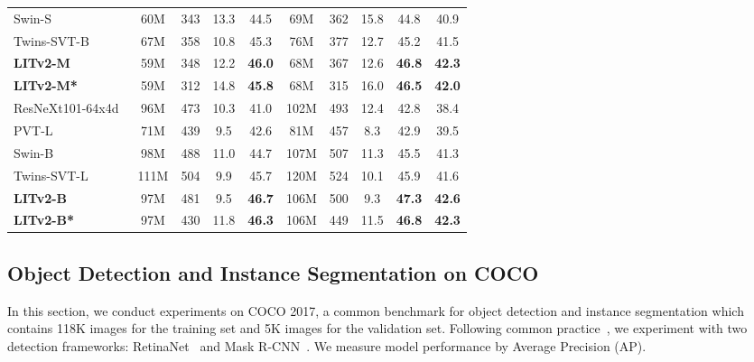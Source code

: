 \begin{table}[]
{\begin{tabular}{l|cccc|ccccc}
Swin-S~\cite{swin}                    & 60M         & 343       & 13.3 & 44.5          & 69M         & 362       & 15.8 & 44.8          & 40.9          \\
Twins-SVT-B~\cite{chu2021Twins}               & 67M         & 358       & 10.8 & 45.3          & 76M         & 377       & 12.7 & 45.2          & 41.5          \\
\textbf{LITv2-M}                  & 59M         & 348       & 12.2 & \textbf{46.0} & 68M         & 367       & 12.6 & \textbf{46.8} & \textbf{42.3} \\
\textbf{LITv2-M*}                  & 59M         & 312       & \textcolor{mblue}{14.8} & \textbf{45.8} & 68M         & 315       & \textcolor{mblue}{16.0} & \textbf{46.5} & \textbf{42.0} \\ \hline
ResNeXt101-64x4d~\cite{resnext}          & 96M         & 473       &  10.3    & 41.0          & 102M        & 493       &  12.4    & 42.8          & 38.4          \\
PVT-L~\cite{pvt}                    & 71M         & 439       & 9.5     & 42.6          & 81M         & 457       & 8.3     & 42.9          & 39.5          \\
Swin-B~\cite{swin}                 & 98M         & 488       & 11.0 & 44.7          & 107M        & 507       & 11.3 & 45.5          & 41.3          \\
Twins-SVT-L~\cite{chu2021Twins}              & 111M        & 504       & 9.9  & 45.7          & 120M        & 524       & 10.1 & 45.9          & 41.6          \\
\textbf{LITv2-B}          & 97M         & 481       & 9.5     & \textbf{46.7} & 106M        & 500       &  9.3    & \textbf{47.3} & \textbf{42.6} \\
\textbf{LITv2-B*}        & 97M         & 430       & \textcolor{mblue}{11.8}     & \textbf{46.3} & 106M        & 449       & \textcolor{mblue}{11.5}     & \textbf{46.8} & \textbf{42.3}
\end{tabular}
}
\vspace{-8mm}
\end{table}

\vspace{-0.5em}
\subsection{Object Detection and Instance Segmentation on COCO} \label{sec:coco}
In this section, we conduct experiments on COCO 2017, a common benchmark for object detection and instance segmentation which contains 118K images for the training set and 5K images for the validation set. Following common practice~\cite{chu2021Twins,pvt}, we experiment with two detection frameworks: RetinaNet~\cite{retinanet} and Mask R-CNN~\cite{mask_rcnn}. We measure model performance by Average Precision (AP). 

